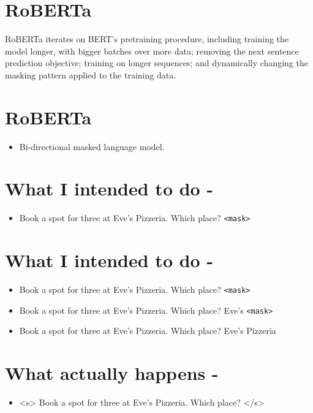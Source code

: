 \documentclass[11pt]{article}
\begin{document}
\section{RoBERTa}
\label{sec:org491ad61}

RoBERTa iterates on BERT's pretraining procedure, including training the model longer, with bigger batches over more data; removing the next sentence prediction objective; training on longer sequences; and dynamically changing the masking pattern applied to the training data.


\section{RoBERTa}
\label{sec:org8edc141}

\begin{itemize}
\item Bi-directional masked language model.
\end{itemize}

\section{What I intended to do -}
\label{sec:orgae2a165}

\begin{itemize}
\item Book a spot for three at Eve's Pizzeria. Which place? \texttt{<mask>}
\end{itemize}

\section{What I intended to do -}
\label{sec:org7a027fc}
\begin{itemize}
\item Book a spot for three at Eve's Pizzeria. Which place? \texttt{<mask>}
\item Book a spot for three at Eve's Pizzeria. Which place? Eve's \texttt{<mask>}
\item Book a spot for three at Eve's Pizzeria. Which place? Eve's Pizzeria
\end{itemize}

\section{What actually happens -}
\label{sec:org5b1a3ca}


\begin{itemize}
\item <s> Book a spot for three at Eve's Pizzeria. Which place? </s>
\end{itemize}
\end{document}
